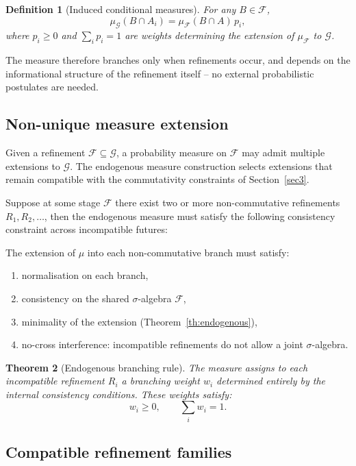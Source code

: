\documentclass[
 amsmath,amssymb,
  onecolumn %
]{revtex4-2}
\newtheorem{theorem}{Theorem} [section]
\newtheorem{definition}[theorem]{Definition}
\begin{document}
\begin{definition}[Induced conditional measures]
For any $B\in\mathcal{F}$,
\[
\mu_{\mathcal{G}}(B \cap A_i)
= \mu_{\mathcal{F}}(B \cap A)\, p_i,
\]
where $p_i\ge0$ and $\sum_i p_i=1$ are weights determining the
extension of $\mu_{\mathcal F}$ to $\mathcal G$.
\end{definition}

The measure therefore branches only when refinements occur, and depends on 
the informational structure of the refinement itself -- no external probabilistic postulates are needed.

\subsection{Non-unique measure extension} 
Given a refinement $\mathcal F\subseteq\mathcal G$,
a probability measure on $\mathcal F$ may admit multiple
extensions to $\mathcal G$.
The endogenous measure construction selects extensions that
remain compatible with the commutativity constraints of
Section~\ref{sec3}.

Suppose at some stage $ \mathcal{F} $ there exist two or more non-commutative refinements $ R_1, R_2, \dots $, then the endogenous measure must satisfy the following consistency constraint across incompatible futures:

\medskip

The extension of $ \mu $ into each non-commutative branch must satisfy:
\begin{enumerate}[label=(\roman*), leftmargin=2em]
\item normalisation on each branch,
\item consistency on the shared $\sigma$-algebra $\mathcal{F}$,
\item minimality of the extension (Theorem~\ref{th:endogenous}),
\item no-cross interference: incompatible refinements do not allow a joint $\sigma$-algebra.
\end{enumerate}
\begin{theorem}[Endogenous branching rule]
The measure assigns to each incompatible refinement $ R_i $ a branching weight $ w_i $ determined entirely by the internal consistency conditions.
These weights satisfy:
$$
w_i \ge 0, \qquad \sum_i w_i = 1.
$$
\end{theorem} 


\subsection{Compatible refinement families}
\end{document}
